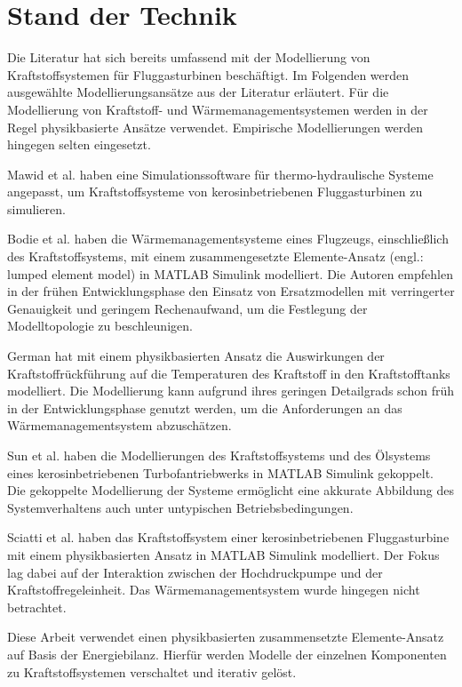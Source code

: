 \chapter{Stand der Technik}\label{chap:standdertechnik}

Die Literatur hat sich bereits umfassend mit der Modellierung von Kraftstoffsystemen für Fluggasturbinen beschäftigt. Im Folgenden werden ausgewählte Modellierungsansätze aus der Literatur erläutert. Für die Modellierung von Kraftstoff- und Wärmemanagementsystemen werden in der Regel physikbasierte Ansätze verwendet. Empirische Modellierungen werden hingegen selten eingesetzt. 

Mawid et al. \cite{Mawid.1998} haben eine Simulationssoftware für thermo-hydraulische Systeme angepasst, um  Kraftstoffsysteme von kerosinbetriebenen Fluggasturbinen zu simulieren. 

Bodie et al. \cite{Bodie.2010} haben die Wärmemanagementsysteme eines Flugzeugs, einschließlich des Kraftstoffsystems, mit einem zusammengesetzte Elemente-Ansatz (engl.: lumped element model) in MATLAB Simulink modelliert. Die Autoren empfehlen in der frühen Entwicklungsphase den Einsatz von Ersatzmodellen mit verringerter Genauigkeit und geringem Rechenaufwand, um die Festlegung der Modelltopologie zu beschleunigen.

German \cite{German.2012} hat mit einem physikbasierten Ansatz die Auswirkungen der Kraftstoffrückführung auf die Temperaturen des Kraftstoff in den Kraftstofftanks modelliert. Die Modellierung kann aufgrund ihres geringen Detailgrads schon früh in der Entwicklungsphase genutzt werden, um die Anforderungen an das Wärmemanagementsystem abzuschätzen.

Sun et al. \cite{Sun.2019} haben die Modellierungen des Kraftstoffsystems und des Ölsystems eines kerosinbetriebenen Turbofantriebwerks in MATLAB Simulink gekoppelt. Die gekoppelte Modellierung der Systeme ermöglicht eine akkurate Abbildung des Systemverhaltens auch unter untypischen Betriebsbedingungen.

Sciatti et al. \cite{Sciatti.2022} haben das Kraftstoffsystem einer kerosinbetriebenen Fluggasturbine mit einem physikbasierten Ansatz in MATLAB Simulink modelliert. Der Fokus lag dabei auf der Interaktion zwischen der Hochdruckpumpe und der Kraftstoffregeleinheit. Das Wärmemanagementsystem wurde hingegen nicht betrachtet. 

Diese Arbeit verwendet einen physikbasierten zusammensetzte Elemente-Ansatz auf Basis der Energiebilanz. Hierfür werden Modelle der einzelnen Komponenten zu Kraftstoffsystemen verschaltet und iterativ gelöst.